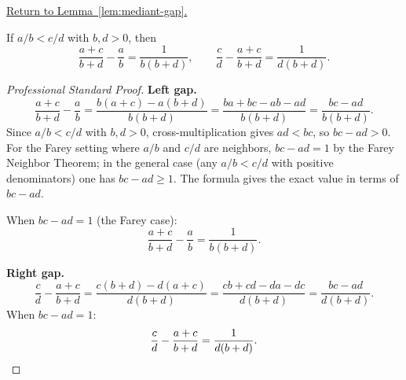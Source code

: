 
\newpage
{}
\label{prf:mediant-gap}

\begin{remark*}[Return]
\hyperref[lem:mediant-gap]{Return to Lemma~\ref*{lem:mediant-gap}.}
\end{remark*}

\begin{lemma*}
If $a/b < c/d$ with $b, d > 0$, then
\[
\frac{a+c}{b+d} - \frac{a}{b} = \frac{1}{b(b+d)},
\qquad
\frac{c}{d} - \frac{a+c}{b+d} = \frac{1}{d(b+d)}.
\]
\end{lemma*}

\begin{proof}[Professional Standard Proof]
\LRAProofBodyStart
\textbf{Left gap.}
\[
\frac{a+c}{b+d} - \frac{a}{b}
= \frac{b(a+c) - a(b+d)}{b(b+d)}
= \frac{ba + bc - ab - ad}{b(b+d)}
= \frac{bc - ad}{b(b+d)}.
\]
Since $a/b < c/d$ with $b,d > 0$, cross-multiplication gives $ad < bc$,
so $bc - ad > 0$.  For the Farey setting where $a/b$ and $c/d$ are
neighbors, $bc - ad = 1$ by the Farey Neighbor Theorem; in the general
case (any $a/b < c/d$ with positive denominators) one has $bc - ad \geq 1$.
The formula gives the exact value in terms of $bc - ad$.

When $bc - ad = 1$ (the Farey case):
\[
\frac{a+c}{b+d} - \frac{a}{b} = \frac{1}{b(b+d)}.
\]

\textbf{Right gap.}
\[
\frac{c}{d} - \frac{a+c}{b+d}
= \frac{c(b+d) - d(a+c)}{d(b+d)}
= \frac{cb + cd - da - dc}{d(b+d)}
= \frac{bc - ad}{d(b+d)}.
\]
When $bc - ad = 1$:
\[
\frac{c}{d} - \frac{a+c}{b+d} = \frac{1}{d(b+d)}.
\qedhere
\]
\end{proof}

